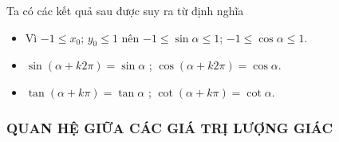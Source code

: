 \begin{itemize}
\begin{tcolorbox}[colframe=cyan,colback=red!1!white,boxrule=0.5mm]
	 Ta có các kết quả sau được suy ra từ định nghĩa
	\begin{itemize}
		\item [\ding{172}] Vì $-1 \le x_0;\,y_0 \le 1$ nên 	$-1 \le \sin \alpha \le 1$; \quad
		$-1 \le \cos \alpha \le 1$.
		\item [\ding{173}] $\sin \left( \alpha + k2 \pi \right) = \sin \alpha$ ; \quad
		$\cos \left( \alpha + k2 \pi \right) = \cos \alpha$.
		\item [\ding{174}] $\tan \left( \alpha + k \pi \right) = \tan \alpha$ ; \quad
		$\cot \left( \alpha + k \pi \right) = \cot \alpha$.
	\end{itemize}
\end{tcolorbox}
\end{itemize}


\subsubsection{QUAN HỆ GIỮA CÁC GIÁ TRỊ LƯỢNG GIÁC}

